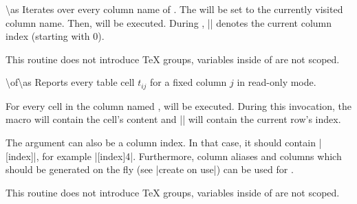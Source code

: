 \begin{command}{\pgfplotstableforeachcolumn{}\textbackslash as}
    Iterates over every column name of . The  will be set to the currently visited column name. Then, 
    will be executed. During , |\pgfplotstablecol| denotes the
    current column index (starting with 0).
\begin{codeexample}[pre={\begin{lateximage}},post={\end{lateximage}}]
\begin{minipage}{0.8\linewidth}
\loadedtable
\pgfplotstableforeachcolumn\loadedtable\as{}
\end{minipage}
\end{codeexample}

    This routine does not introduce \TeX{} groups, variables inside of
     are not scoped.
\end{command}

\begin{command}{\pgfplotstableforeachcolumnelement{}\textbackslash of\textbackslash as}
    Reports every table cell $t_{ij}$ for a fixed column $j$ in read-only mode.

    For every cell in the column named ,  will be
    executed. During this invocation, the macro  will contain the cell's content and |\pgfplotstablerow| will
    contain the current row's index.
\begin{codeexample}[pre={\begin{lateximage}},post={\end{lateximage}}]
\begin{minipage}{0.8\linewidth}
\loadedtable
{}\of\loadedtable\as{}
\end{minipage}
\end{codeexample}
    The argument  can also be a column index. In that case,
    it should contain |[index]|, for example |[index]4|.
    Furthermore, column aliases and columns which should be generated on the
    fly (see |create on use|) can be used for .

    This routine does not introduce \TeX{} groups, variables inside of
     are not scoped.
\end{command}

